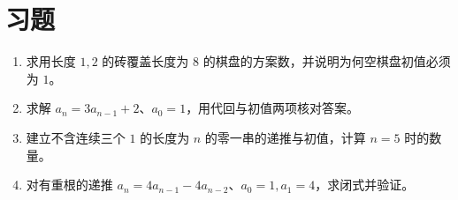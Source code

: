 \section{习题}
\begin{enumerate}
  \item\label{ex:recurrences-1} 求用长度 $1,2$ 的砖覆盖长度为 $8$ 的棋盘的方案数，并说明为何空棋盘初值必须为 $1$。
  \item\label{ex:recurrences-2} 求解 $a_n=3a_{n-1}+2$、$a_0=1$，用代回与初值两项核对答案。
  \item\label{ex:recurrences-3} 建立不含连续三个 $1$ 的长度为 $n$ 的零一串的递推与初值，计算 $n=5$ 时的数量。
  \item\label{ex:recurrences-4} 对有重根的递推 $a_n=4a_{n-1}-4a_{n-2}$、$a_0=1,a_1=4$，求闭式并验证。
\end{enumerate}

